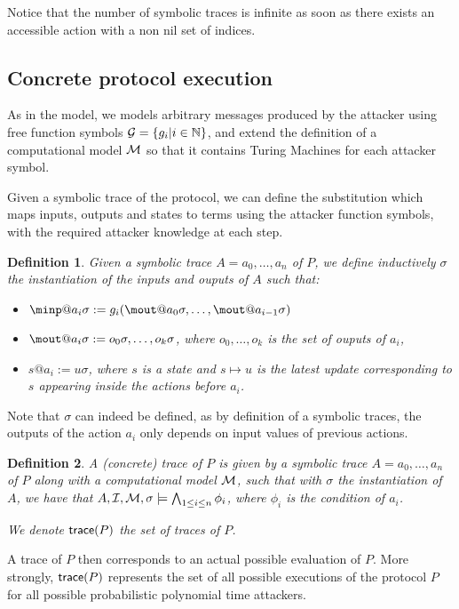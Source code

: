 \documentclass[a4paper]{article}
\newtheorem{definition}{Definition}
\theoremstyle{remark}
\begin{document}
Notice that the number of symbolic traces is infinite as soon as there exists an accessible action with a non nil set of indices.


\subsection{Concrete protocol execution}
As in the \BC model, we models arbitrary messages produced by the attacker using free function symbols $\mathcal{G} = \{g_i | i \in \mathbb{N}\} $, and extend the definition of a computational model $\mathcal{M}$ so that it contains Turing Machines for each attacker symbol.

Given a symbolic trace of the protocol, we can define the substitution which maps inputs, outputs and states to terms using the attacker function symbols, with the required attacker knowledge at each step.

\begin{definition}
  Given a symbolic trace $A = a_0,\dots,a_n$ of $P$, we define inductively $\sigma$ the instantiation of the inputs and ouputs of $A$ such that:
  \begin{itemize}
  \item $\minp@a_i\sigma := g_i( \mout@a_0\sigma,\dots,\mout@a_{i-1}\sigma  ) $
  \item $\mout@a_i\sigma := o_0\sigma, \dots, o_k\sigma$, where $o_0,\dots,o_k$ is the set of ouputs of  $a_i$,
    \item $s@a_i := u\sigma$, where $s$ is a state and $s \mapsto u$ is the latest update corresponding to $s$ appearing inside the actions before $a_i$.
\end{itemize}
\end{definition}
Note that $\sigma$ can indeed be defined, as by definition of a symbolic traces, the outputs of the action $a_i$ only depends on input values of previous actions.

\begin{definition}
  A (concrete) trace of $P$ is given by a symbolic trace $A = a_0,\dots,a_n$ of $P$ along with a computational model $\mathcal{M}$, such that with $\sigma$ the instantiation of $A$, we have that $A,\mathcal{I},\mathcal{M},\sigma \models \bigwedge_{1\leq i \leq n} \phi_i$, where $\phi_i$ is the condition of $a_i$.

  We denote $\textsf{trace}(P)$ the set of traces of $P$.
\end{definition}

A trace of $P$ then corresponds to an actual possible evaluation of $P$. More strongly, $\textsf{trace}(P)$ represents the set of all possible executions of the protocol $P$ for all possible probabilistic polynomial time attackers.
\end{document}
